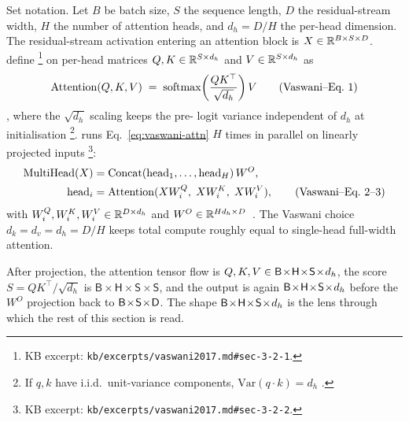 Set notation. Let $B$ be batch size, $S$ the sequence length, $D$
the residual-stream width, $H$ the number of attention heads, and
$d_h = D / H$ the per-head dimension. The residual-stream activation
entering an attention block is $X \in \mathbb{R}^{B \times S \times D}$.
\citet{vaswani2017} define %
\footnote{KB excerpt: \texttt{kb/excerpts/vaswani2017.md\#sec-3-2-1}.}
on per-head matrices $Q, K \in \mathbb{R}^{S \times d_h}$ and
$V \in \mathbb{R}^{S \times d_h}$ as
\begin{equation}
  \mathrm{Attention}(Q, K, V) \;=\;
  \operatorname{softmax}\!\left(\frac{Q K^\top}{\sqrt{d_h}}\right) V
  \tag{Vaswani--Eq.~1}
  \label{eq:vaswani-attn}
\end{equation}
\citep[\S 3.2.1, Eq.~1]{vaswani2017}, where the $\sqrt{d_h}$ scaling
keeps the pre- logit variance independent of $d_h$ at
initialisation%
\footnote{If $q, k$ have i.i.d.\ unit-variance components,
$\mathrm{Var}(q\!\cdot\!k) = d_h$ \citep[\S 3.2.1, fn.~4]{vaswani2017}.}.
 runs Eq.~\eqref{eq:vaswani-attn} $H$ times in
parallel on linearly projected inputs%
\footnote{KB excerpt: \texttt{kb/excerpts/vaswani2017.md\#sec-3-2-2}.}:
\begin{align}
  \mathrm{MultiHead}(X)
   &= \mathrm{Concat}(\mathrm{head}_1, \ldots, \mathrm{head}_H)\,W^O,
   \notag \\
  \mathrm{head}_i
   &= \mathrm{Attention}(X W_i^Q,\; X W_i^K,\; X W_i^V),
  \tag{Vaswani--Eq.~2--3}
  \label{eq:vaswani-mh}
\end{align}
with $W_i^Q, W_i^K, W_i^V \in \mathbb{R}^{D \times d_h}$ and
$W^O \in \mathbb{R}^{H d_h \times D}$~\citep[\S 3.2.2, Eq.~2--3]{vaswani2017}.
The Vaswani choice $d_k = d_v = d_h = D/H$ keeps total compute roughly
equal to single-head full-width attention.

After projection, the attention tensor flow is
$Q, K, V \in \mathsf{B}\!\times\!\mathsf{H}\!\times\!\mathsf{S}\!\times\!d_h$, the score $S = QK^\top/\sqrt{d_h}$ is
$\mathsf{B}\!\times\!\mathsf{H}\!\times\!\mathsf{S}\!\times\!\mathsf{S}$,
and the output is again $\mathsf{B}\!\times\!\mathsf{H}\!\times\!\mathsf{S}\!\times\!d_h$ before the $W^O$ projection back to
$\mathsf{B}\!\times\!\mathsf{S}\!\times\!\mathsf{D}$. The shape $\mathsf{B}\!\times\!\mathsf{H}\!\times\!\mathsf{S}\!\times\!d_h$ is the lens through which the rest of this
section is read.


